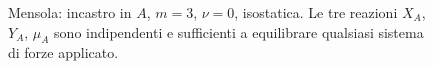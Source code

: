 \begin{figure}[ht]
	\centering
	\caption{Mensola: incastro in $A$, $m=3$, $\nu=0$, isostatica.
		Le tre reazioni $X_A$, $Y_A$, $\mu_A$ sono indipendenti
		e sufficienti a equilibrare qualsiasi sistema di forze
		applicato.}
	\label{fig:catalogo_mensola}
\end{figure}

